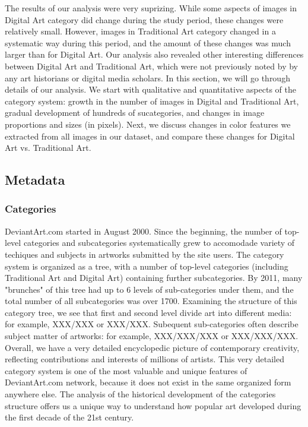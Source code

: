 \documentclass[letterpaper]{article}
\begin{document}
The results of our analysis were very suprizing. While some aspects of images in Digital Art category did change during the study period, these changes were relatively small. However, images in Traditional Art category changed in a systematic way during this period, and the amount of these changes was much larger than for Digital Art. Our analysis also revealed other interesting differences between Digital Art and Traditional Art, which were not previously noted by by any art historians or digital media scholars.  In this section, we will go through details of our analysis. We start with qualitative and quantitative aspects of the category system: growth in the number of images in Digital and Traditional Art, gradual development of hundreds of sucategories, and changes in image proportions and sizes (in pixels). Next, we discuss changes in color features we extracted from all images in our dataset, and compare these changes for Digital Art vs. Traditional Art.

\subsection{Metadata}

\subsubsection{Categories} DeviantArt.com started in August 2000. Since the beginning, the number of top-level categories and subcategories systematically grew to accomodade variety of techiques and subjects in artworks submitted by the site users. The category system is organized as a tree, with a number of top-level categories (including Traditional Art and Digital Art) containing further subcategories. By 2011, many "brunches" of this tree had up to 6 levels of sub-categories under them, and the total number of all subcategories was over 1700. Examining the structure of this category tree, we see that first and second level divide art into different media: for example, XXX/XXX or XXX/XXX. Subequent sub-categories often describe subject matter of artworks: for example, XXX/XXX/XXX or XXX/XXX/XXX. Overall, we have a very detailed encyclopedic picture of contemporary creativity, reflecting contributions and interests of millions of artists. This very detailed category system is one of the most valuable and unique features of DeviantArt.com network, because it does not exist in the same organized form anywhere else. The analysis of the historical development of the categories structure offers us a unique way to understand how popular art developed during the first decade of the 21st century.  
\end{document}
